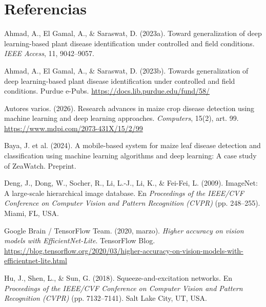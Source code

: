\documentclass[12pt,letterpaper]{article}
\begin{document}
\section{Referencias}

\noindent\hangindent=1.27cm
Ahmad, A., El Gamal, A., \& Saraswat, D. (2023a). Toward generalization of deep learning-based plant disease identification under controlled and field conditions. \textit{IEEE Access}, 11, 9042--9057.

\par\bigskip
\noindent\hangindent=1.27cm
Ahmad, A., El Gamal, A., \& Saraswat, D. (2023b). Towards generalization of deep learning-based plant disease identification under controlled and field conditions. Purdue e-Pubs. \url{https://docs.lib.purdue.edu/fund/58/}

\par\bigskip
\noindent\hangindent=1.27cm
Autores varios. (2026). Research advances in maize crop disease detection using machine learning and deep learning approaches. \textit{Computers}, 15(2), art. 99. \url{https://www.mdpi.com/2073-431X/15/2/99}

\par\bigskip
\noindent\hangindent=1.27cm
Baya, J. et al. (2024). A mobile-based system for maize leaf disease detection and classification using machine learning algorithms and deep learning: A case study of ZeaWatch. Preprint.

\par\bigskip
\noindent\hangindent=1.27cm
Deng, J., Dong, W., Socher, R., Li, L.-J., Li, K., \& Fei-Fei, L. (2009). ImageNet: A large-scale hierarchical image database. En \textit{Proceedings of the IEEE/CVF Conference on Computer Vision and Pattern Recognition (CVPR)} (pp. 248--255). Miami, FL, USA.

\par\bigskip
\noindent\hangindent=1.27cm
Google Brain / TensorFlow Team. (2020, marzo). \textit{Higher accuracy on vision models with EfficientNet-Lite}. TensorFlow Blog. \url{https://blog.tensorflow.org/2020/03/higher-accuracy-on-vision-models-with-efficientnet-lite.html}

\par\bigskip
\noindent\hangindent=1.27cm
Hu, J., Shen, L., \& Sun, G. (2018). Squeeze-and-excitation networks. En \textit{Proceedings of the IEEE/CVF Conference on Computer Vision and Pattern Recognition (CVPR)} (pp. 7132--7141). Salt Lake City, UT, USA.
\end{document}
